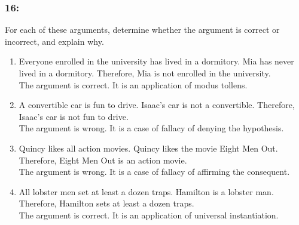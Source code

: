 \documentclass[12pt,en,a4paper]{report}
\begin{document}
	\subsubsection*{16:}
	For each of these arguments, determine whether the argument is correct or incorrect, and explain why.
	\begin{enumerate}[label=\textbf{\alph*)}]
		\item Everyone enrolled in the university has lived in a dormitory. Mia has never lived in a dormitory. Therefore, Mia is not enrolled in the university.\\
		The argument is correct. It is an application of modus tollens.
		\item A convertible car is fun to drive. Isaac's car is not a convertible. Therefore, Isaac's car is not fun to drive.\\
		The argument is wrong. It is a case of fallacy of denying the hypothesis.
		\item Quincy likes all action movies. Quincy likes the movie Eight Men Out. Therefore, Eight Men Out is an action movie.\\
		The argument is wrong. It is a case of fallacy of affirming the consequent.
		\item All lobster men set at least a dozen traps. Hamilton is a lobster man. Therefore, Hamilton sets at least a dozen traps.\\
		The argument is correct. It is an application of universal instantiation.
	\end{enumerate}
\end{document}
